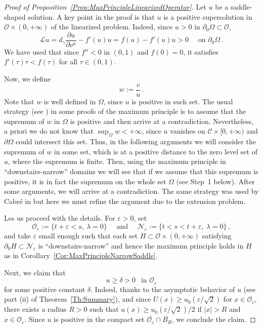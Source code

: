 \documentclass[12pt,reqno]{amsart}
\theoremstyle{definition}
\theoremstyle{remark}
\newcommand{\ccal}{\mathscr{C}}
\newcommand{\ocal}{\mathcal{O}}
\newcommand{\s}{\gamma}
\numberwithin{equation}{section}
\begin{document}
\begin{proof}[Proof of Proposition~\ref{Prop:MaxPrincipleLinearizedOperator}]
Let $u$ be a saddle-shaped solution. A key point in the proof is that $u$ is a positive supersolution in $\ocal\times(0,+\infty)$ of the linearized problem. Indeed, since $u>0$ in $\partial_0\Omega \subset \ocal$,
\begin{equation}
\label{Eq:uSupersolLinearized}
\mathscr{L}u = d_\s \dfrac{\partial u}{\partial \nu^a}  -f'(u) u = f(u) - f'(u) u > 0\quad \text{ on } \partial_0\Omega \,.
\end{equation}
We have used that since $f''<0$ in $(0,1)$ and $f(0)=0$, it satisfies $f'(\tau)\tau < f(\tau)$ for all $\tau\in (0,1)$.


Now, we define
$$
w := \dfrac{v}{u}\,.
$$
Note that $w$ is well defined in $\Omega$, since $u$ is positive in such set. The usual strategy (see \cite{BerestyckiNirembergVaradhan}) in some proofs of the maximum principle is to assume that the supremum of $w$ in $\Omega$ is positive and then arrive at a contradiction.  Nevertheless, a priori we do not know that $\sup_\Omega w< +\infty$, since $u$ vanishes on $\ccal\times [0,+\infty)$ and $\partial \Omega$ could intersect this set. Thus, in the following arguments we will consider the supremum of $w$ in some set, which is at a positive distance to the zero level set of $u$, where the supremum is finite. Then, using the maximum principle in ``downstairs-narrow'' domains we will see that if we assume that this supremum is positive, it is in fact the supremum on the whole set $\Omega$ (see Step~1 below). After some arguments, we will arrive at a contradiction. The same strategy was used by Cabré in \cite{Cabre-Saddle} but here we must refine the argument due to the extension problem.


Les us proceed with the details. For $\varepsilon > 0$, set
$$
\ocal_\varepsilon := \{t +\varepsilon < s,\ \lambda = 0 \} \quad \textrm{ and } \quad \mathcal{N}_\varepsilon := \{t < s < t+\varepsilon ,\ \lambda = 0 \}\,,
$$
and take $\varepsilon$ small enough such that each set $H \subset \ocal \times (0,+\infty)$ satisfying $\partial_0 H \subset \mathcal{N}_\varepsilon$  is ``downstairs-narrow'' and hence the maximum principle holds in $H$ as in Corollary~\ref{Cor:MaxPrincipleNarrowSaddle}. 

Next, we claim that
\begin{equation}
	\label{Eq:u>delta}
	u \geq \delta >0\ \ \text{ in }   \ocal_\varepsilon
\end{equation}
for some positive constant $\delta$. Indeed, thanks to the asymptotic behavior of $u$ (see part (ii) of Theorem~\ref{Th:Summary}), and since $U(x) \geq u_0(\varepsilon/\sqrt{2})$ for $x\in \ocal_\varepsilon$,  there exists a radius $R>0$ such that $u(x) \geq u_0(\varepsilon/\sqrt{2})/2$ if $|x|>R$ and $x\in \ocal_\varepsilon$. Since $u$ is positive in the compact set $\overline{\ocal_\varepsilon} \cap \overline{B_R}$, we conclude the claim.


\end{proof}
\end{document}
